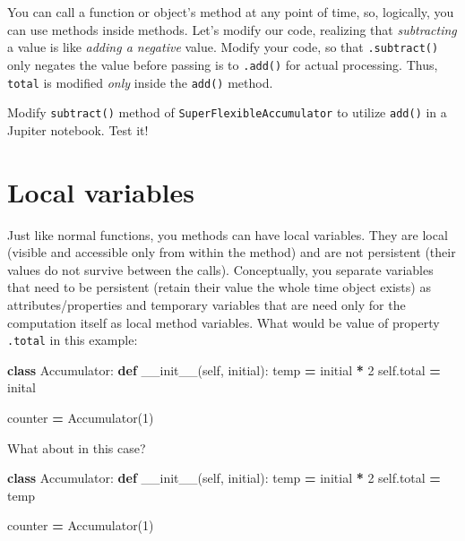 \documentclass[
]{book}
\newenvironment{Shaded}{\begin{snugshade}}{\end{snugshade}}
\newcommand{\DecValTok}[1]{\textcolor[rgb]{0.00,0.00,0.81}{#1}}
\newcommand{\FunctionTok}[1]{\textcolor[rgb]{0.00,0.00,0.00}{#1}}
\newcommand{\KeywordTok}[1]{\textcolor[rgb]{0.13,0.29,0.53}{\textbf{#1}}}
\newcommand{\NormalTok}[1]{#1}
\newcommand{\OperatorTok}[1]{\textcolor[rgb]{0.81,0.36,0.00}{\textbf{#1}}}
\newcommand{\VariableTok}[1]{\textcolor[rgb]{0.00,0.00,0.00}{#1}}
\begin{document}
You can call a function or object's method at any point of time, so, logically, you can use methods inside methods. Let's modify our code, realizing that \emph{subtracting} a value is like \emph{adding a negative} value. Modify your code, so that \texttt{.subtract()} only negates the value before passing is to \texttt{.add()} for actual processing. Thus, \texttt{total} is modified \emph{only} inside the \texttt{add()} method.

Modify \texttt{subtract()} method of \texttt{SuperFlexibleAccumulator} to utilize \texttt{add()} in a Jupiter notebook. Test it!

\hypertarget{local-variables}{%
\section{Local variables}\label{local-variables}}

Just like normal functions, you methods can have local variables. They are local (visible and accessible only from within the method) and are not persistent (their values do not survive between the calls). Conceptually, you separate variables that need to be persistent (retain their value the whole time object exists) as attributes/properties and temporary variables that are need only for the computation itself as local method variables. What would be value of property \texttt{.total} in this example:

\begin{Shaded}
\begin{Highlighting}[]
\KeywordTok{class}\NormalTok{ Accumulator:}
    \KeywordTok{def} \FunctionTok{\_\_init\_\_}\NormalTok{(}\VariableTok{self}\NormalTok{, initial):}
\NormalTok{        temp }\OperatorTok{=}\NormalTok{ initial }\OperatorTok{*} \DecValTok{2}
        \VariableTok{self}\NormalTok{.total }\OperatorTok{=}\NormalTok{ inital}
        
\NormalTok{counter }\OperatorTok{=}\NormalTok{ Accumulator(}\DecValTok{1}\NormalTok{)}
\end{Highlighting}
\end{Shaded}

What about in this case?

\begin{Shaded}
\begin{Highlighting}[]
\KeywordTok{class}\NormalTok{ Accumulator:}
    \KeywordTok{def} \FunctionTok{\_\_init\_\_}\NormalTok{(}\VariableTok{self}\NormalTok{, initial):}
\NormalTok{        temp }\OperatorTok{=}\NormalTok{ initial }\OperatorTok{*} \DecValTok{2}
        \VariableTok{self}\NormalTok{.total }\OperatorTok{=}\NormalTok{ temp}
        
\NormalTok{counter }\OperatorTok{=}\NormalTok{ Accumulator(}\DecValTok{1}\NormalTok{)}
\end{Highlighting}
\end{Shaded}
\end{document}
